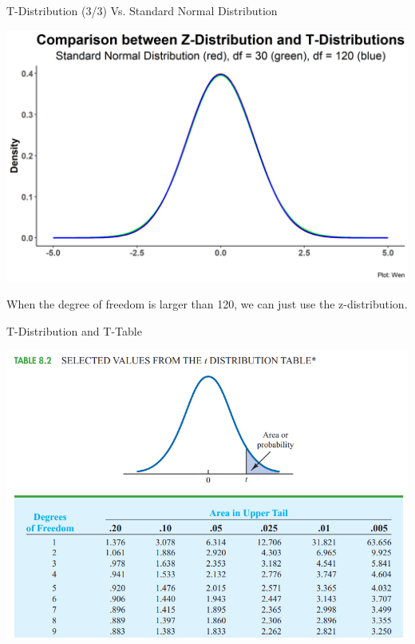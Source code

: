 \documentclass{beamer}
\begin{document}
\begin{frame}{T-Distribution (3/3) Vs. Standard Normal Distribution}


\begin{center}
\includegraphics[scale=0.52]{images/normalandTdf-2.png}

\end{center}
When the degree of freedom is larger than 120, we can just use the z-distribution. 

\end{frame}




\begin{frame}{T-Distribution and T-Table}

\includegraphics[scale=0.5]{images/section5ttable.png}

\end{frame}
\end{document}
